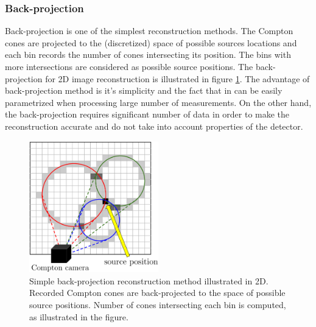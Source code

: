 \subsubsection{Back-projection}
Back-projection is one of the simplest reconstruction methods. 
The Compton cones are projected to the (discretized) space of possible sources locations and each bin records the number of cones intersecting its position. 
The bins with more intersections are considered as possible source positions.
The back-projection for 2D image reconstruction is illustrated in figure \ref{fig:bppp}.
The advantage of back-projection method is it's simplicity and the fact that in can be easily parametrized when processing large number of measurements.
On the other hand, the back-projection requires significant number of data in order to make the reconstruction accurate and do not take into account properties of the detector.
  \begin{figure}[!h]
    \centering
      \includegraphics[width=0.5\textwidth]{./fig/photos/back_proppp.eps}
    \caption{Simple back-projection reconstruction method illustrated in 2D. Recorded Compton cones are back-projected to the space of possible source positions. Number of cones intersecting each bin is computed, as illustrated in the figure.}
    \label{fig:bppp}
  \end{figure}

